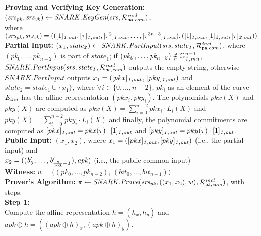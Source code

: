 \noindent \textbf{Proving and Verifying Key Generation:} $(\mathit{srs}_{\mathit{pk}}, \mathit{srs}_{\mathit{vk}}) \leftarrow \mathit{SNARK.KeyGen}(\mathit{srs}, \mathcal{R}^{\mathit{incl}}_{\mathsf{pa},\mathit{com}})$, \\
where $(\mathit{srs}_{\mathit{pk}}, \mathit{srs}_{\mathit{vk}}) = 
(([1]_{\mathit{1,out}}, [\tau]_{\mathit{1,out}}, [\tau^2]_{\mathit{1,out}}, \ldots, [\tau^{3n-3}]_{\mathit{1,out}}), ([1]_{\mathit{1,out}}, [1]_{\mathit{2,out}}, [\tau]_{\mathit{2,out}}))$ \\

\noindent \textbf{Partial Input:} $(x_1, \mathit{state_2}) \leftarrow \mathit{SNARK.PartInput}(\mathit{srs}, \mathit{state_1}, \mathcal{R}^{\mathit{incl}}_{\mathsf{pa},\mathit{com}})$, where $(\mathit{pk_0}, \ldots, \mathit{pk_{n-2}})$ is part of $\mathit{state_1}$; 
if $(\mathit{pk_0}, \ldots, \mathit{pk_{n-2}}) \notin \mathbb{G}_{\mathit{1,inn}}^{n-1}$, $\mathit{SNARK.PartInput}(\mathit{srs}, \mathit{state_1}, \mathcal{R}^{\mathit{incl}}_{\mathsf{pa},\mathit{com}})$ outputs the empty string, otherwise 
$\mathit{SNARK.PartInput}$ outputs $x_1 = ([pkx]_{\mathit{1,out}}$, $[pky]_{\mathit{1,out}})$ and $\mathit{state_2} = \mathit{state_1} \cup \{ x_1\}$, where $\forall i \in \{0, \ldots, n-2\}$, $\mathit{pk_i}$ as an element of the curve $\mathit{E}_{\mathit{inn}}$ 
has the affine representation $(\mathit{pkx_i}, \mathit{pky_i})$. The polynomials $pkx(X)$ and $pky(X)$ are computed as $pkx(X) = \sum_{i=0}^{n-2} \mathit{pkx_i} \cdot L_i(X)$ 
and $pky(X) = \sum_{i=0}^{n-2} \mathit{pky_i} \cdot L_i(X)$ and finally, the polynomial commitments are computed as 
$[pkx]_{\mathit{1,out}} = pkx(\tau) \cdot [1]_{\mathit{1,out}}$ and $[pky]_{\mathit{1,out}} = pky(\tau) \cdot [1]_{\mathit{1,out}}$.\\

\noindent \textbf{Public Input:} $(x_1, x_2)$, where $x_1 = ([pkx]_{\mathit{1,out}}, [pky]_{\mathit{1,out}})$ (i.e., the partial input) and \\
 $x_2 = ((\mathit{b'_{0}}, \ldots, \mathit{b'_{\frac{n}{\mathsf{block}}-1}}), \mathit{apk})$ (i.e., the public common input)\\

\noindent \textbf{Witness:}
$w = ((\mathit{pk_0}, \ldots, \mathit{pk_{n-2}})$, $(\mathit{bit}_0, \ldots, \mathit{bit_{n-1}}))$ \\

\noindent \textbf{Prover's Algorithm:} $ \pi \leftarrow \mathit{SNARK.Prove}(\mathit{srs_{pk}}, ((x_1, x_2), w), \mathcal{R}^{\mathit{incl}}_{\mathsf{pa},\mathit{com}})$, with steps:\\

\noindent \textbf{Step 1:} \\
\noindent Compute the affine representation $h = (h_x, h_y)$ and  $apk \oplus h = ((apk \oplus h)_{x}, (apk \oplus h)_{y})$. \\

